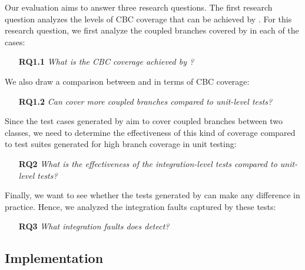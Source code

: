 Our evaluation aims to answer three research questions.
The first research question analyzes the levels of CBC coverage that can be achieved by \cling. 
For this research question, we first analyze the coupled branches covered by \cling in each of the cases:
\begin{itemize}
		\item[\textbf{RQ1.1}] \textit{What is the CBC coverage achieved by \cling? }
\end{itemize}
We also draw a comparison between \cling and \evosuite in terms of CBC coverage:
\begin{itemize}
		\item[\textbf{RQ1.2}] \textit{Can \cling cover more coupled branches compared to unit-level tests? }
\end{itemize}
Since the test cases generated by \cling aim to cover coupled branches between two classes, we need to determine the effectiveness of this kind of coverage compared to test suites generated for high branch coverage in unit testing:
\begin{itemize}
	\item[\textbf{RQ2}] \textit{What is the effectiveness of the integration-level tests compared to unit-level tests?}
\end{itemize} 
Finally, we want to see whether the tests generated by \cling can make any difference in practice. Hence, we analyzed the integration faults captured by these tests:
\begin{itemize}
	\item[\textbf{RQ3}] \textit{What integration faults does \cling detect?}
\end{itemize}

\subsection{Implementation}
\label{sec:implementation}

